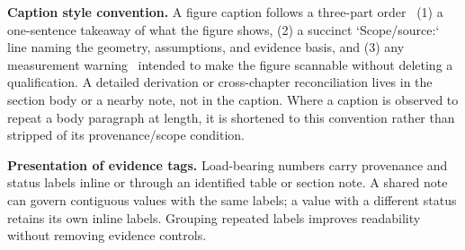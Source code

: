 \medskip
\noindent\textbf{Caption style convention.} A figure caption follows a three-part order \textemdash\ (1) a one-sentence takeaway of what the figure shows, (2) a succinct `Scope/source:` line naming the geometry, assumptions, and evidence basis, and (3) any measurement warning \textemdash\ intended to make the figure scannable without deleting a qualification. A detailed derivation or cross-chapter reconciliation lives in the section body or a nearby note, not in the caption. Where a caption is observed to repeat a body paragraph at length, it is shortened to this convention rather than stripped of its provenance/scope condition.

\noindent\textbf{Presentation of evidence tags.} Load-bearing numbers carry provenance and status labels inline or through an identified table or section note. A shared note can govern contiguous values with the same labels; a value with a different status retains its own inline labels. Grouping repeated labels improves readability without removing evidence controls.
